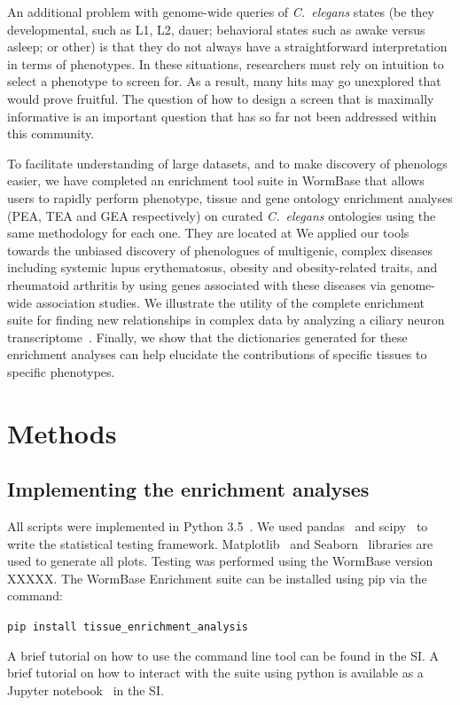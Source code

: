 \documentclass[10pt,letterpaper,twocolumn]{article}
\newcommand{\cel}{\emph{C.~elegans}}
\begin{document}
An additional problem with genome-wide
queries of \cel{} states (be they developmental, such as
L1, L2, dauer; behavioral states such as awake versus asleep; or other) is that
they do not
always have a straightforward interpretation in terms of phenotypes. In these
situations, researchers must rely on intuition to select a phenotype to screen
for. As a result, many hits may go unexplored that would prove fruitful. The
question of how to design a screen that is maximally informative is an important
question that has so far not been addressed within this community.

To facilitate understanding of large datasets, and to make discovery of
phenologs easier, we have completed an enrichment tool suite in WormBase
that allows users to rapidly perform phenotype, tissue and gene ontology
enrichment analyses (PEA, TEA and GEA respectively) on curated \cel{} ontologies
using the same methodology for each one. They are located at
We applied our tools towards the unbiased discovery of phenologues of
multigenic, complex diseases including
systemic lupus erythematosus, obesity and obesity-related traits,  and
rheumatoid arthritis
by using genes associated with these
diseases via genome-wide association studies. We illustrate the utility of
the complete enrichment suite for finding new relationships in complex data by
analyzing a ciliary neuron transcriptome~\cite{Wang2015}. Finally, we show that
the dictionaries generated for these enrichment analyses can help elucidate the
contributions of specific tissues to specific phenotypes.

\section*{Methods}
\subsection*{Implementing the enrichment analyses}
All scripts were implemented in Python 3.5~\cite{Rossum2011}. We used
pandas~\cite{McKinney2011} and scipy~\cite{Oliphant2007} to write the
statistical testing framework. Matplotlib~\cite{Hunter2007} and Seaborn~\cite{Waskom}
libraries are used to generate all plots. Testing was performed using the
WormBase version XXXXX. The WormBase Enrichment suite can be installed using
pip via the command:

\texttt{pip install tissue\_enrichment\_analysis}

A brief tutorial on how to use the command line tool can be found in the SI.
A brief tutorial on how to interact with the suite using python is available
as a Jupyter notebook~\cite{Perez2007} in the SI.
\end{document}
